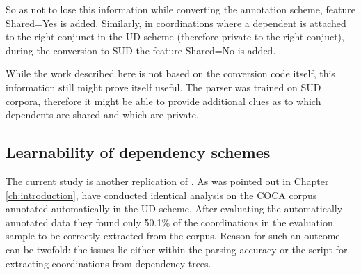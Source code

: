 \begin{exe}
    \ex
    \label{ex:SUD 1,5h straight}
\end{exe}

So as not to lose this information while converting the annotation scheme, feature \textsf{Shared=Yes} is added. Similarly, in coordinations where a dependent is attached to the right conjunct in the UD scheme (therefore private to the right conjuct), during the conversion to SUD the feature \textsf{Shared=No} is added.

While the work described here is not based on the conversion code itself, this information still might prove itself useful. The parser was trained on SUD corpora, therefore it might be able to provide additional clues as to which dependents are shared and which are private. 

\subsection{Learnability of dependency schemes}\label{sec:learnability}
The current study is another replication of \cite{prz:woz:23}. As was pointed out in Chapter \ref{ch:introduction}, \cite{pbg2023} have conducted identical analysis on the COCA corpus annotated automatically in the UD scheme. After evaluating the automatically annotated data they found only 50.1\% of the coordinations in the evaluation sample to be correctly extracted from the corpus. Reason for such an outcome can be twofold: the issues lie either within the parsing accuracy or the script for extracting coordinations from dependency trees. 


